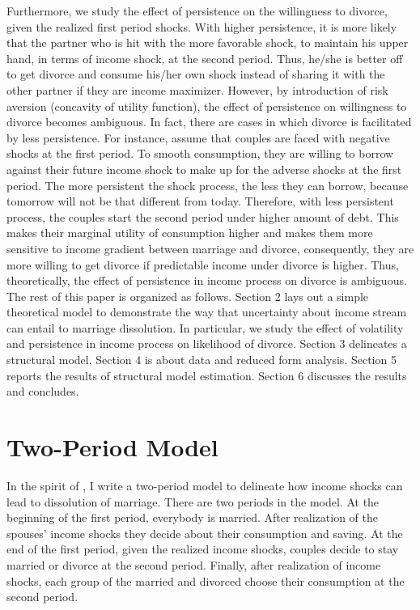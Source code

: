 Furthermore, we study the effect of persistence on the willingness to divorce, given the realized first period shocks. With higher persistence, it is more likely that the partner who is hit with the more favorable shock, to maintain his upper hand, in terms of income shock, at the second period. Thus, he/she is better off to get divorce and consume his/her own shock instead of sharing it with the other partner if they are income maximizer. However, by introduction of risk aversion (concavity of utility function), the effect of persistence on willingness to divorce becomes ambiguous. In fact, there are cases in which divorce is facilitated by less persistence. For instance, assume that couples are faced with negative shocks at the first period. To smooth consumption, they are willing to borrow against their future income shock to make up for the adverse shocks at the first period. The more persistent the shock process, the less they can borrow, because tomorrow will not be that different from today.  Therefore, with less persistent process, the couples start the second period under higher amount of debt.  This makes their marginal utility of consumption higher and makes them more sensitive to income gradient between marriage and divorce, consequently, they are more willing to get divorce if predictable income under divorce is higher. Thus, theoretically, the effect of persistence in income process on divorce is ambiguous. \\

The rest of this paper is organized as follows. Section 2 lays out a simple theoretical model to demonstrate the way that uncertainty about income stream can entail to marriage dissolution. In particular, we study the effect of volatility and persistence in income process on likelihood of divorce. Section 3 delineates a structural model. Section 4 is about data and reduced form analysis. Section 5 reports the results of structural model estimation. Section 6 discusses the results and concludes. \\

\section{Two-Period Model} 

In the spirit of \citet{Hess_2004}, I write a two-period model to delineate how income shocks can lead to dissolution of marriage. There are two periods in the model. At the beginning of the first period, everybody is married. After realization of the spouses' income shocks they decide about their consumption and saving. At the end of the first period, given the realized income shocks, couples decide to stay married or divorce at the second period. Finally, after realization of income shocks, each group of the married and divorced choose their consumption at the second period. 

